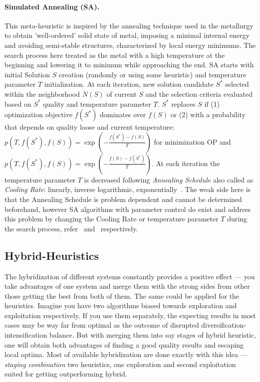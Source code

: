 \paragraph{Simulated Annealing (SA).} This meta-heuristic is inspired by the annealing technique used in the metallurgy to obtain 'well-ordered' solid state of metal, imposing a minimal internal energy and avoiding semi-stable structures, characterized by local energy minimums. The search process here treated as the metal with a high temperature at the beginning and lowering it to minimum while approaching the end. %
SA starts with initial Solution $S$ creation (randomly or using some heuristic) and temperature parameter $T$ initialization. At each iteration, new solution candidate $S^*$ selected within the neighborhood $N(S)$ of current $S$ and the selection criteria evaluated based on $S^*$ quality and temperature parameter $T$. $S^*$ replaces $S$ if (1) optimization objective $f(S^*)$ dominates over $f(S)$ or (2) with a probability that depends on quality loose and current temperature: $p(T, f(S^*), f(S)) = \exp(-\frac{f(S^*) - f(S)}{T})$ for minimization OP and $p(T, f(S^*), f(S)) = \exp(-\frac{f(S) - f(S^*)}{T})$. At each iteration the temperature parameter $T$ is decreased following \textit{Annealing Schedule} also called as \textit{Cooling Rate}: linearly, inverse logarithmic, exponentially~\cite{boussaid2013survey}. The weak side here is that the Annealing Schedule is problem dependent and cannot be determined beforehand, however SA algorithms with parameter control do exist and address this problem by changing the Cooling Rate or temperature parameter $T$ during the search process, refer~\cite{ingber2000adaptive} and~\cite{de2003placement} respectively.

\subsection{Hybrid-Heuristics}
The hybridization of different systems constantly provides a positive effect — you take advantages of one system and merge them with the strong sides from other those getting the best from both of them. The same could be applied for the heuristics. Imagine you have two algorithms biased towards exploration and exploitation respectively. If you use them separately, the expecting results in most cases may be way far from optimal as the outcome of disrupted diversification-intensification balance. But with merging them into say stages of hybrid heuristic, one will obtain both advantages of finding a good quality results and escaping local optima. Most of available hybridization are done exactly with this idea — \textit{staging combination} two heuristics, one exploration and second exploitation suited for getting outperforming hybrid.



